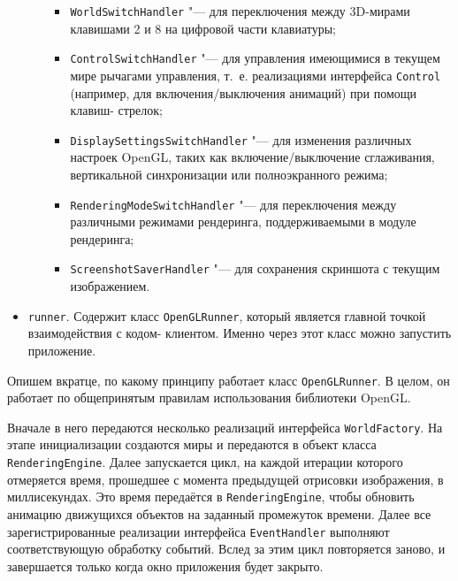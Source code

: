 \begin{itemize}
\begin{itemize}
        \begin{itemize}
        \item \texttt{WorldSwitchHandler} "--- для переключения между 3D-мирами клавишами 2 и 8 на цифровой части
        клавиатуры;
        \item \texttt{ControlSwitchHandler} "--- для управления имеющимися в текущем мире рычагами управления, т.~е.
        реализациями интерфейса \texttt{Control} (например, для включения/выключения анимаций) при помощи клавиш-
        стрелок;
        \item \texttt{DisplaySettingsSwitchHandler} "--- для изменения различных настроек OpenGL, таких как
        включение/выключение сглаживания, вертикальной синхронизации или полноэкранного режима;
        \item \texttt{RenderingModeSwitchHandler} "--- для переключения между различными режимами рендеринга,
        поддерживаемыми в модуле рендеринга;
        \item \texttt{ScreenshotSaverHandler} "--- для сохранения скриншота с текущим изображением.
        \end{itemize}

    \end{itemize}

\item \texttt{runner}. Содержит класс \texttt{OpenGLRunner}, который является главной точкой взаимодействия с кодом-
клиентом. Именно через этот класс можно запустить приложение.

\end{itemize}

Опишем вкратце, по какому принципу работает класс \texttt{OpenGLRunner}. В целом, он работает по общепринятым правилам
использования библиотеки OpenGL.

Вначале в него передаются несколько реализаций интерфейса \texttt{WorldFactory}. На этапе инициализации создаются миры
и передаются в объект класса \texttt{Rende\-ringEngine}. Далее запускается цикл, на каждой итерации которого отмеряется
время, прошедшее с момента предыдущей отрисовки изображения, в миллисекундах. Это время передаётся в
\texttt{RenderingEngine}, чтобы обновить анимацию движущихся объектов на заданный промежуток времени. Далее все
зарегистрированные реализации интерфейса \texttt{EventHandler} выполняют соответствующую обработку событий. Вслед
за этим цикл повторяется заново, и завершается только когда окно приложения будет закрыто.
